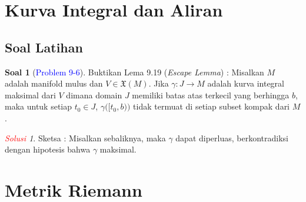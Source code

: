 \documentclass[11pt]{article}
\theoremstyle{definition}
\newtheorem*{problem}{Soal}
\theoremstyle{remark}
\newtheorem*{solution}{\textcolor{red}{Solusi}}
\newcommand{\vectfield}{\mathfrak{X}}       %
\begin{document}
\section{Kurva Integral dan Aliran}
\subsection{Soal Latihan}
\begin{problem}[\textcolor{blue}{Problem 9-6}]
Buktikan Lema 9.19 (\textit{Escape Lemma}) : Misalkan $M$ adalah manifold mulus dan $V \in \vectfield(M)$. Jika $\gamma : J \to M$ adalah kurva integral maksimal dari $V$ dimana domain $J$ memiliki batas atas terkecil yang berhingga $b$, maka untuk setiap $t_0 \in J$, $\gamma\big([t_0,b)\big)$ tidak termuat di setiap subset kompak dari $M$.
\end{problem}

\begin{solution}
Sketsa : Misalkan sebaliknya, maka $\gamma$ dapat diperluas, berkontradiksi dengan hipotesis bahwa $\gamma$ maksimal.
\end{solution}




\section{Metrik Riemann}
\end{document}
